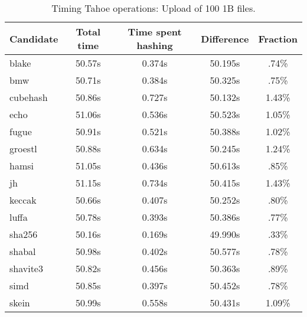 \begin{table}[h]
  \centering
  \begin{tabular}{ | l | c | c | c | c | }
    \hline
    Candidate & Total time & Time spent hashing & Difference & Fraction \\ \hline
    blake & 50.57s & 0.374s & 50.195s & .74\% \\ \hline
    bmw & 50.71s & 0.384s & 50.325s & .75\% \\ \hline
    cubehash & 50.86s & 0.727s & 50.132s & 1.43\% \\ \hline
    echo & 51.06s & 0.536s & 50.523s & 1.05\% \\ \hline
    fugue & 50.91s & 0.521s & 50.388s & 1.02\% \\ \hline
    groestl & 50.88s & 0.634s & 50.245s & 1.24\% \\ \hline
    hamsi & 51.05s & 0.436s & 50.613s & .85\% \\ \hline
    jh & 51.15s & 0.734s & 50.415s & 1.43\% \\ \hline
    keccak & 50.66s & 0.407s & 50.252s & .80\% \\ \hline
    luffa & 50.78s & 0.393s & 50.386s & .77\% \\ \hline
    sha256 & 50.16s & 0.169s & 49.990s & .33\% \\ \hline
    shabal & 50.98s & 0.402s & 50.577s & .78\% \\ \hline
    shavite3 & 50.82s & 0.456s & 50.363s & .89\% \\ \hline
    simd & 50.85s & 0.397s & 50.452s & .78\% \\ \hline
    skein & 50.99s & 0.558s & 50.431s & 1.09\% \\ \hline
  \end{tabular}
  \caption{Timing Tahoe operations: Upload of 100 1B files.}
  \label{tbl:hashingtimes:put1b}
\end{table}

